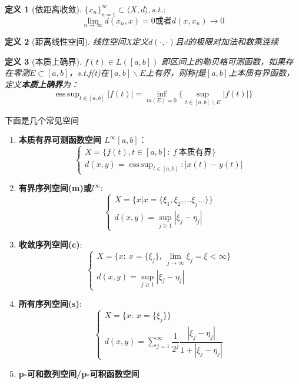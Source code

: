 \documentclass[12pt, a4paper, oneside, fontset=windows]{ctexbook}
\newtheorem{definition}{定义}[section]
\DeclareMathOperator*{\esssup}{ess\,sup}
\begin{document}
    \begin{definition}[依距离收敛]
        $\{x_n\}^{\infty}_{n=1} \subset \langle X,d\rangle,s.t.:$
        \[ \lim_{n \to \infty} d(x_n,x)=0 \text{或者} d(x,x_n) \to 0 \]  
    \end{definition}

    \begin{definition}[距离线性空间]
        线性空间X定义$d(\cdot ,\cdot )$且d的极限对加法和数乘连续       
    \end{definition}

    \begin{definition}[本质上确界]
        $f(t)\in L([a,b])$ 即区间上的勒贝格可测函数，如果存在零测$E \subset [a,b]$，s.t.f(t)在$[a,b]\backslash E$上有界，则称f是$[a,b]$上本质有界函数，定义\textbf{本质上确界}为：
        \[ \esssup_{t\in [a,b]}|f(t)|=\inf_{m(E)=0}\{\sup_{t\in [a,b]\backslash E}|f(t)|\}\]
        
    \end{definition}
    下面是几个常见空间
    \begin{enumerate}
        \item {\bf 本质有界可测函数空间 $L^{\infty}[a,b]$}：
        \[
        \begin{cases}
            \displaystyle X=\{f(t),t\in [a,b]:\ f\ \text{本质有界}\}\\
            \displaystyle d(x,y)=\esssup_{t\in [a,b]}:|x(t)-y(t)|
        \end{cases}
        \]
        \item {\bf 有界序列空间(m)或$l^{\infty}$}:
        \[ \begin{cases}
            \displaystyle X=\{x|x=\{\xi_1,\xi_2,...\xi_j...\}\}\\
            \displaystyle d(x,y)=\sup_{j\ge 1} |\xi _j - \eta _j |
            \end{cases}\]

        \item {\bf 收敛序列空间(c)}: 
        \[
            \begin{cases}
                \displaystyle X=\{x:\ x=\{\xi_j\},\ \lim_{j\to \infty}\xi_j=\xi  < \infty\}\\
                \displaystyle d(x,y)=\sup_{j\ge 1} |\xi _j - \eta _j |
            \end{cases}
        \]
        \item {\bf 所有序列空间(s)}: 
        \[
            \begin{cases}
                \displaystyle X=\{x:\ x=\{\xi_j\}\}\\
                \displaystyle d(x,y) = \displaystyle \sum_{j=1}^{\infty } \dfrac{1}{2^j} \dfrac{|\xi_j - \eta_j|}{1+|\xi_j -\eta_j|}
            \end{cases}
        \]
        \item {\bf p-可和数列空间/p-可积函数空间}
    \end{enumerate}
        
\end{document}
